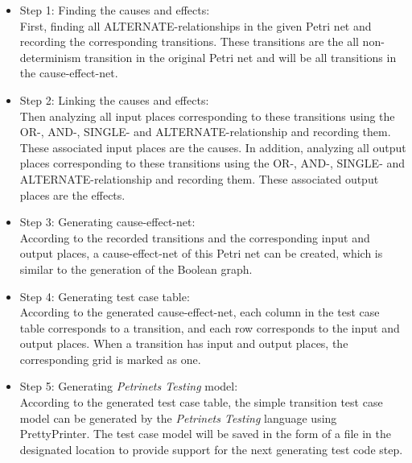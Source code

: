 \begin{itemize}
    \item Step 1: Finding the causes and effects: \\
    First, finding all ALTERNATE-relationships in the given Petri net and recording the corresponding transitions. These transitions are the all non-determinism transition in the original Petri net and will be all transitions in the cause-effect-net. \\
    
    \item Step 2: Linking the causes and effects: \\
    Then analyzing all input places corresponding to these transitions using the OR-, AND-, SINGLE- and ALTERNATE-relationship and recording them. These associated input places are the causes. In addition, analyzing all output places corresponding to these transitions using the OR-, AND-, SINGLE- and ALTERNATE-relationship and recording them. These associated output places are the effects. \\
    
    \item Step 3: Generating cause-effect-net: \\
    According to the recorded transitions and the corresponding input and output places, a cause-effect-net of this Petri net can be created, which is similar to the generation of the Boolean graph. \\
    
    \item Step 4: Generating test case table: \\
    According to the generated cause-effect-net, each column in the test case table corresponds to a transition, and each row corresponds to the input and output places. When a transition has input and output places, the corresponding grid is marked as one.\\
    
    \item Step 5: Generating \emph{Petrinets Testing} model: \\
    According to the generated test case table, the simple transition test case model can be generated by the \emph{Petrinets Testing} language using PrettyPrinter. The test case model will be saved in the form of a file in the designated location to provide support for the next generating test code step.
    
\end{itemize}

